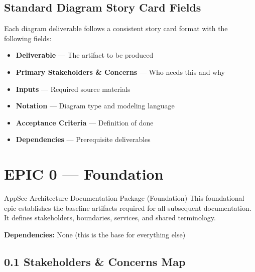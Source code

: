 \documentclass[11pt,letterpaper]{article}
\begin{document}
\subsection{Standard Diagram Story Card Fields}

Each diagram deliverable follows a consistent story card format with the following fields:

\begin{storycard}
\begin{itemize}[nosep]
    \item \textbf{Deliverable} --- The artifact to be produced
    \item \textbf{Primary Stakeholders \& Concerns} --- Who needs this and why
    \item \textbf{Inputs} --- Required source materials
    \item \textbf{Notation} --- Diagram type and modeling language
    \item \textbf{Acceptance Criteria} --- Definition of done
    \item \textbf{Dependencies} --- Prerequisite deliverables
\end{itemize}
\end{storycard}

\newpage

\section{EPIC 0 --- Foundation}

\begin{epicbox}{AppSec Architecture Documentation Package (Foundation)}
This foundational epic establishes the baseline artifacts required for all subsequent documentation. It defines stakeholders, boundaries, services, and shared terminology.

\textbf{Dependencies:} None (this is the base for everything else)
\end{epicbox}

\subsection{0.1 Stakeholders \& Concerns Map}
\end{document}
